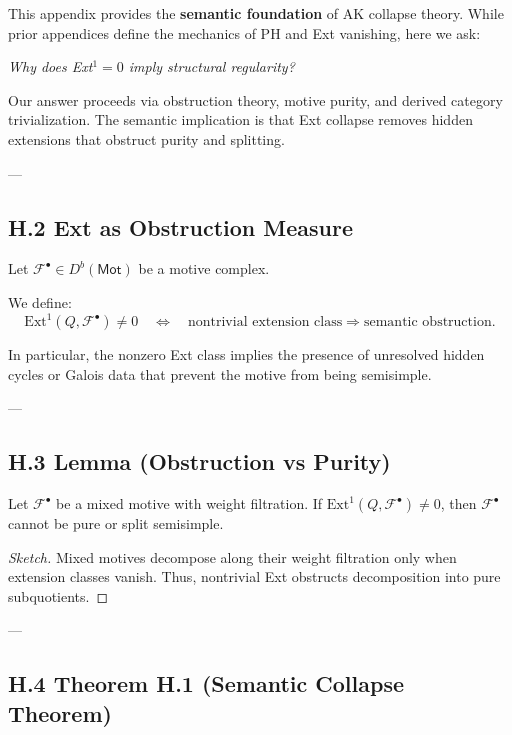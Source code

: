 This appendix provides the \textbf{semantic foundation} of AK collapse theory.  
While prior appendices define the mechanics of PH and Ext vanishing,  
here we ask:

\begin{center}
\textit{Why does Ext$^1 = 0$ imply structural regularity?}  
\end{center}

Our answer proceeds via obstruction theory, motive purity, and derived category trivialization.  
The semantic implication is that Ext collapse removes hidden extensions that obstruct purity and splitting.

---

\subsection*{H.2 Ext as Obstruction Measure}

Let \( \mathcal{F}^\bullet \in D^b(\mathsf{Mot}) \) be a motive complex.

\begin{definition}
We define:
\[
\mathrm{Ext}^1(Q, \mathcal{F}^\bullet) \neq 0 \quad \Leftrightarrow \quad 
\text{nontrivial extension class} \Rightarrow \text{semantic obstruction}.
\]
\end{definition}

In particular, the nonzero Ext class implies the presence of unresolved hidden cycles or Galois data  
that prevent the motive from being semisimple.

---

\subsection*{H.3 Lemma (Obstruction vs Purity)}

\begin{lemma}
Let \( \mathcal{F}^\bullet \) be a mixed motive with weight filtration.  
If \( \mathrm{Ext}^1(Q, \mathcal{F}^\bullet) \neq 0 \), then \( \mathcal{F}^\bullet \) cannot be pure or split semisimple.
\end{lemma}

\begin{proof}[Sketch]
Mixed motives decompose along their weight filtration only when extension classes vanish.  
Thus, nontrivial Ext obstructs decomposition into pure subquotients.
\end{proof}

---

\subsection*{H.4 Theorem H.1 (Semantic Collapse Theorem)}

